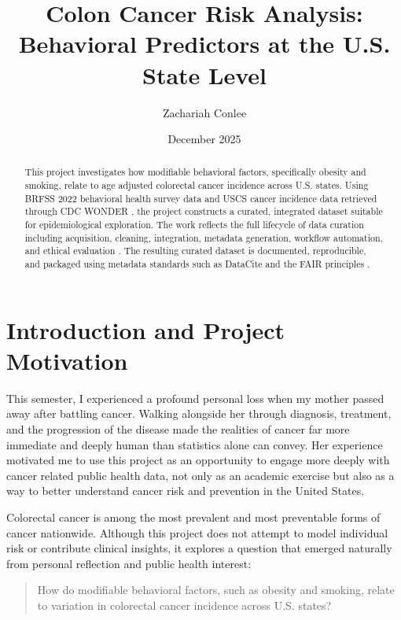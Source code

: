 \documentclass[12pt]{article}
\title{Colon Cancer Risk Analysis:\\
Behavioral Predictors at the U.S. State Level}
\author{Zachariah Conlee}
\date{December 2025}
\begin{document}
\maketitle

\begin{abstract}
This project investigates how modifiable behavioral factors, specifically obesity and smoking, relate to age adjusted colorectal cancer incidence across U.S. states. Using BRFSS 2022 behavioral health survey data \parencite{cdc2023brfss} and USCS cancer incidence data retrieved through CDC WONDER \parencite{cdc2024uscs}, the project constructs a curated, integrated dataset suitable for epidemiological exploration. The work reflects the full lifecycle of data curation including acquisition, cleaning, integration, metadata generation, workflow automation, and ethical evaluation \parencite{lord2004}. The resulting curated dataset is documented, reproducible, and packaged using metadata standards such as DataCite \parencite{group2021} and the FAIR principles \parencite{wilkinson2016}.
\end{abstract}

\section{Introduction and Project Motivation}

This semester, I experienced a profound personal loss when my mother passed away after battling cancer. Walking alongside her through diagnosis, treatment, and the progression of the disease made the realities of cancer far more immediate and deeply human than statistics alone can convey. Her experience motivated me to use this project as an opportunity to engage more deeply with cancer related public health data, not only as an academic exercise but also as a way to better understand cancer risk and prevention in the United States.

Colorectal cancer is among the most prevalent and most preventable forms of cancer nationwide. Although this project does not attempt to model individual risk or contribute clinical insights, it explores a question that emerged naturally from personal reflection and public health interest:

\begin{quote}
How do modifiable behavioral factors, such as obesity and smoking, relate to variation in colorectal cancer incidence across U.S. states?
\end{quote}
\end{document}
